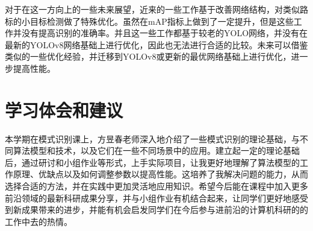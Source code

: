 \documentclass{article}
\begin{document}
对于在这一方向上的一些未来展望，近来的一些工作基于改善网络结构，对类似路标的小目标检测做了特殊优化。虽然在mAP指标上做到了一定提升，但是这些工作并没有提高识别的准确率。并且这一些工作都基于较老的YOLO网络，并没有在最新的YOLOv8网络基础上进行优化，因此也无法进行合适的比较。未来可以借鉴类似的一些优化经验，并迁移到YOLOv8或更新的最优网络基础上进行优化，进一步提高性能。

\section{学习体会和建议}
本学期在模式识别课上，方昱春老师深入地介绍了一些模式识别的理论基础，与不同算法模型和技术，以及它们在一些不同场景中的应用。建立起一定的理论基础后，通过研讨和小组作业等形式，上手实际项目，让我更好地理解了算法模型的工作原理、优缺点以及如何调整参数以提高性能。这培养了我解决问题的能力，从而选择合适的方法，并在实践中更加灵活地应用知识。希望今后能在课程中加入更多前沿领域的最新科研成果分享，并与小组作业有机结合起来，让同学们更好地感受到新成果带来的进步，并能有机会启发同学们在今后参与进前沿的计算机科研的的工作中去的热情。



\newpage{}
\appendix
\end{document}
